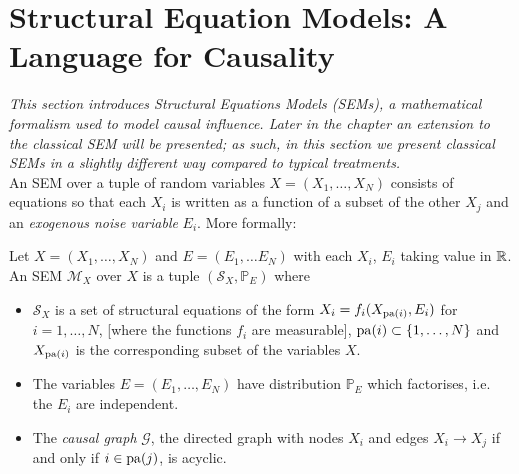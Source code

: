 

\section{Structural Equation Models: A Language for Causality}

\emph{This section introduces Structural Equations Models (SEMs), a mathematical formalism used to model causal influence. Later in the chapter an extension to the classical SEM will be presented; as such, in this section we present classical SEMs in a slightly different way compared to typical treatments.}
\\

\noindent An SEM over a tuple of random variables $X = (X_1, \ldots, X_N)$ consists of equations so that each $X_i$ is written as a function of a subset of the other $X_j$ and an \emph{exogenous noise variable} $E_i$. More formally:

\begin{definition}
Let $X = (X_1, \ldots, X_N)$ and $E = (E_1, \ldots E_N)$ with each $X_i$, $E_i$ taking value in $\mathbb{R}$. An SEM $\mathcal{M}_X$ over $X$ is a tuple $(\mathcal{S}_X, \mathbb{P}_E)$ where
\begin{itemize}
	\item $\mathcal{S}_X$ is a set of structural equations of the form $X_i = f_i(X_{\operatorname{pa}(i)}, E_i)$ for $i=1,\ldots,N$, [where the functions $f_i$ are measurable], $\operatorname{pa}(i) \subset \{1,\ldots,N\}$ and $X_{\operatorname{pa}(i)}$ is the corresponding subset of the variables $X$.
	\item The variables $E = (E_1,\ldots,E_N)$ have distribution $\mathbb{P}_E$ which factorises, i.e. the $E_i$ are independent.
	\item The \emph{causal graph} $\mathcal{G}$, the directed graph with nodes $X_i$ and edges $X_i \to X_j$ if and only if $i \in \operatorname{pa}(j)$, is acyclic.
\end{itemize}
\end{definition}


